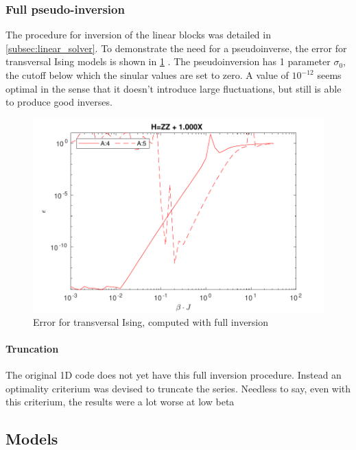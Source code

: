 \subsubsection{Full pseudo-inversion}

The procedure for inversion of the linear blocks was detailed in \cref{subsec:linear_solver}. To demonstrate the need for a pseudoinverse, the error for transversal Ising models is shown in \cref{benc:fig:fullinv} . The pseudoinversion has 1 parameter $\sigma_0$, the cutoff below which the sinular values are set to zero. A value of $10^{-12}$ seems optimal in the sense that it doesn't introduce large fluctuations, but still is able to produce good inverses.

\begin{figure}
  \center
  \includegraphics[width=\textwidth]{Figuren/benchmarking/t_ising_full_inverse.pdf }
  \caption{Error for transversal Ising, computed with full inversion }
  \label{benc:fig:fullinv}
\end{figure}

\paragraph{Truncation}

The original 1D code does not yet have this full inversion procedure. Instead an optimality criterium was devised to truncate the series. Needless to say, even with this criterium, the results were a lot worse at low beta

\subsection{Models}


